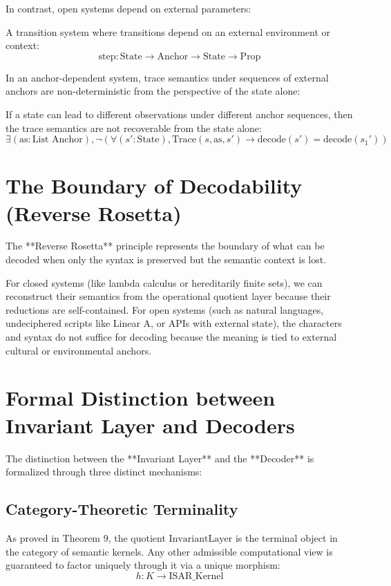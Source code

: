 In contrast, open systems depend on external parameters:

\begin{definition}
A transition system where transitions depend on an external environment or context:
$$\text{step} : \text{State} \to \text{Anchor} \to \text{State} \to \text{Prop}$$
\end{definition}

In an anchor-dependent system, trace semantics under sequences of external anchors are non-deterministic from the perspective of the state alone:

\begin{theorem}
If a state can lead to different observations under different anchor sequences, then the trace semantics are not recoverable from the state alone:
$$\exists (\text{as} : \text{List Anchor}), \neg \left(\forall (s' : \text{State}), \text{Trace}(s, \text{as}, s') \to \text{decode}(s') = \text{decode}(s_1')\right)$$
\end{theorem}

\section{The Boundary of Decodability (Reverse Rosetta)}

The **Reverse Rosetta** principle represents the boundary of what can be decoded when only the syntax is preserved but the semantic context is lost.

For closed systems (like lambda calculus or hereditarily finite sets), we can reconstruct their semantics from the operational quotient layer because their reductions are self-contained. For open systems (such as natural languages, undeciphered scripts like Linear A, or APIs with external state), the characters and syntax do not suffice for decoding because the meaning is tied to external cultural or environmental anchors.

\section{Formal Distinction between Invariant Layer and Decoders}

The distinction between the **Invariant Layer** and the **Decoder** is formalized through three distinct mechanisms:

\subsection{Category-Theoretic Terminality}
As proved in Theorem 9, the quotient $\text{InvariantLayer}$ is the terminal object in the category of semantic kernels. Any other admissible computational view is guaranteed to factor uniquely through it via a unique morphism:
$$h : K \to \text{ISAR\_Kernel}$$

